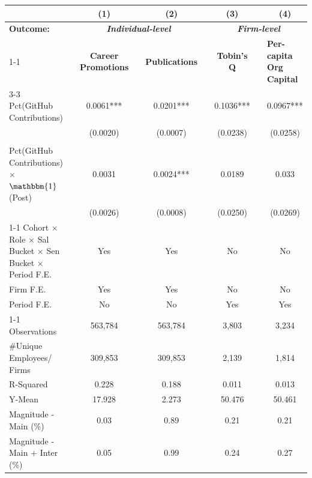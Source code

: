 
\begin{tabular}{lrccccccc}
    \toprule
          &       & (1)   &       & (2)   &       & (3)   &       & (4) \\
    \midrule
    \textbf{Outcome:} &       & \multicolumn{3}{c}{\textit{\textbf{Individual-level}}} &       & \multicolumn{3}{c}{\textit{\textbf{Firm-level}}} \\
\cmidrule{1-1}\cmidrule{3-5}\cmidrule{7-9}          &       & \textbf{Career Promotions} &       & \textbf{Publications} &       & \textbf{Tobin's Q} &       & \multicolumn{1}{l}{\textbf{Per-capita Org Capital}} \\
\cmidrule{3-3}\cmidrule{5-5}\cmidrule{7-7}\cmidrule{9-9}    Pct(GitHub Contributions) &       & 0.0061*** &       & 0.0201*** &       & 0.1036*** &       & 0.0967*** \\
          &       & (0.0020) &       & (0.0007) &       & (0.0238) &       & (0.0258) \\
          &       &       &       &       &       &       &       &  \\
    Pct(GitHub Contributions) $\times$ $\mathbbm{1}$(Post) &       & 0.0031 &       & 0.0024*** &       & 0.0189 &       & 0.033 \\
          &       & (0.0026) &       & (0.0008) &       & (0.0250) &       & (0.0269) \\
\cmidrule{1-1}\cmidrule{3-5}\cmidrule{7-9}    Cohort $\times$ Role $\times$ Sal Bucket $\times$ Sen Bucket $\times$ Period F.E. &       & Yes   &       & Yes   &       & No    &       & No \\
    Firm F.E. &       & Yes   &       & Yes   &       & No    &       & No \\
    Period F.E. &       & No    &       & No    &       & Yes   &       & Yes \\
\cmidrule{1-1}\cmidrule{3-5}\cmidrule{7-9}    Observations &       & 563,784 &       & 563,784 &       & 3,803 &       & 3,234 \\
    \#Unique Employees/ Firms &       & 309,853 &       & 309,853 &       & 2,139 &       & 1,814 \\
    R-Squared &       & 0.228 &       & 0.188 &       & 0.011 &       & 0.013 \\
    Y-Mean &       & 17.928 &       & 2.273 &       & 50.476 &       & 50.461 \\
    Magnitude - Main (\%) &       & 0.03  &       & 0.89  &       & 0.21  &       & 0.21 \\
    Magnitude - Main + Inter (\%) &       & 0.05  &       & 0.99  &       & 0.24  &       & 0.27 \\
    \bottomrule
    \end{tabular}%